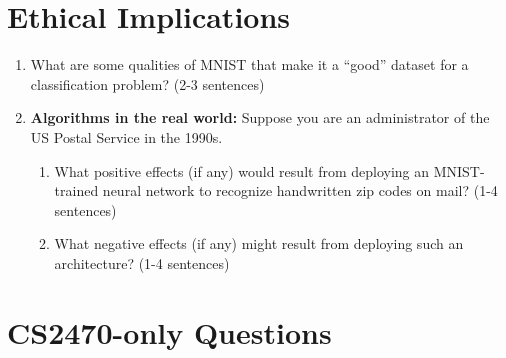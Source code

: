 \documentclass{article}
\begin{document}
\section{Ethical Implications}
\begin{enumerate}
\item What are some qualities of MNIST that make it a ``good'' dataset for a classification problem? (2-3 sentences) 
\item \textbf{Algorithms in the real world:} Suppose you are an administrator of the US Postal Service in the 1990s.
    \begin{enumerate}
        \item What positive effects (if any) would result from deploying an MNIST-trained neural network to recognize handwritten zip codes on mail? (1-4 sentences) 
        \item What negative effects (if any) might result from deploying such an architecture? (1-4 sentences)
        
    \end{enumerate}
    
    
\end{enumerate}

\section{CS2470-only Questions}
\end{document}
